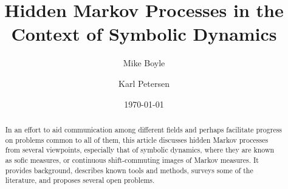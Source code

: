 \documentclass{kepart2010}
\theoremstyle{plain}
\theoremstyle{definition}
\theoremstyle{remark}
\theoremstyle{definition}
\numberwithin{equation}{section}
\begin{document}
\thispagestyle{empty}

\title[Symbolic Dynamics Viewpoint]
{Hidden Markov Processes in the Context of Symbolic Dynamics}


\keywords{}

\author{Mike Boyle}
\address{Department of Mathematics, University of Maryland, College Park, MD 20742-4015 USA}

\author{Karl Petersen}
\address{Department of Mathematics,
CB 3250, Phillips Hall,
         University of North Carolina,
Chapel Hill, NC 27599 USA} 

\date{\today}
\begin{abstract}
{
 In an effort to aid communication among
different fields and perhaps facilitate progress on problems common
to all of them, this article discusses hidden Markov processes from
several viewpoints, especially that of symbolic dynamics, where they
are known as sofic measures, or continuous shift-commuting images of
Markov measures. It provides background, describes known tools and
methods, surveys some of the literature, and proposes several open
problems. }
\end{abstract}

\maketitle

\tableofcontents

\nocite{BoyleTuncel1984,BurkeRosenblatt1958,
  Kleene1956,Schutzenberger1961,
  BerstelReutenauer1988,HanselPerrin1989,
  BinkowskaKaminski1984,Furstenberg1960,
  MarcusPetersenWilliams1984,
  Blackwell1957,Billingsley1995,
  ChazottesUgalde2003,
  DownarowiczMauldin2005,
  Ellis,
  LedrappierWalters1977,
  Parry1964,ParryTuncel1982,
  Petersen1989,Petersen1998,
  PetersenShin2005,PetersenQuasShin2003,
  Phelps2002,ShannonWeaver1949,
  Shin2001,Shin2001-2,Shin2006,
  Walters1986,Kitchens1982}

  \nocite{
  Abdel-MoneimLeysieffer1982,
  Abdel-MoneimLeysieffer1984,
  Ahmad1977,
  Arbib1967,
  Bancilhon1974,
  BlackwellKoopmans1957,
  Bosch1974/75,
  Boudreau1968,
  BurkeRosenblatt1958-2,
  Ellis1976,
  EphraimMerhav2002,
  Erickson1970,
  FoxRubin1968,
  FoxRubin1969,
  FoxRubin1970,
  HachigianRosenblatt1962,
  Heller1967,
  Holland1968,
  InagakiFutumuraMutuura1972,
  Kelly1982,
  KomotaKimura1978, KomotaKimura1978-2,
  KomotaKimura1981,
  Leysieffer1967,
  Madsen1975,
  NeuhoffShields1982,
  Paz1975,
  Robertson1973,
  Robertson1973-2,
  Silio1979}
\end{document}
